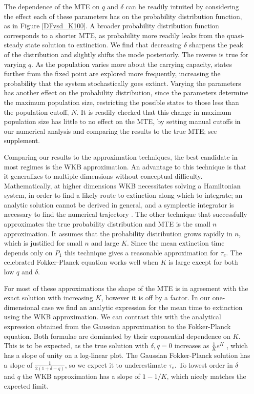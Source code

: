 The dependence of the MTE on $q$ and $\delta$ can be readily intuited by considering the effect each of these parameters has on the probability distribution function, as in Figure \ref{DFvsd_K100}.
A broader probability distribution function corresponds to a shorter MTE, as probability more readily leaks from the quasi-steady state solution to extinction.
We find that decreasing $\delta$ sharpens the peak of the distribution and slightly shifts the mode posteriorly. 
The reverse is true for varying $q$. 
As the population varies more about the carrying capacity, states further from the fixed point are explored more frequently, increasing the probability that the system stochastically goes extinct. 
Varying the parameters has another effect on the probability distribution, since the parameters determine the maximum population size, restricting the possible states to those less than the population cutoff, $N$.
It is readily checked that this change in maximum population size has little to no effect on the MTE, by setting manual cutoffs in our numerical analysis and comparing the results to the true MTE; see supplement.

Comparing our results to the approximation techniques, the best candidate in most regimes is the WKB approximation.
An advantage to this technique is that it generalizes to multiple dimensions without conceptual difficulty.
Mathematically, at higher dimensions WKB necessitates solving a Hamiltonian system, in order to find a likely route to extinction along which to integrate; an analytic solution cannot be derived in general, and a symplectic integrator is necessary to find the numerical trajectory \cite{Channell1990}.
The other technique that successfully approximates the true probability distribution and MTE is the small $n$ approximation. 
It assumes that the probability distribution grows rapidly in $n$, which is justified for small $n$ and large $K$.
Since the mean extinction time depends only on $P_1$ this technique gives a reasonable approximation for $\tau_e$. 
The celebrated Fokker-Planck equation works well when $K$ is large except for both low $q$ and $\delta$. 

For most of these approximations the shape of the MTE is in agreement with the exact solution with increasing $K$, however it is off by a factor.
In our one-dimensional case we find an analytic expression for the mean time to extinction using the WKB approximation.
We can contrast this with the analytical expression obtained from the Gaussian approximation to the Fokker-Planck equation. 
Both formulae are dominated by their exponential dependence on $K$.
This is to be expected, as the true solution with $\delta,q = 0$ increases as $\frac{1}{K}e^K$ \cite{Lande1993}, which has a slope of unity on a log-linear plot. 
The Gaussian Fokker-Planck solution has a slope of $\frac{1}{2(1+\delta-q)}$, so we expect it to underestimate $\tau_e$. 
To lowest order in $\delta$ and $q$ the WKB approximation has a slope of $1-1/K$, which nicely matches the expected limit.

